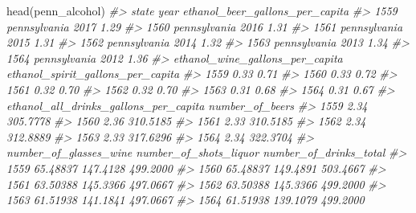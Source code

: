 \documentclass[
  12pt,
]{book}
\newenvironment{Shaded}{\begin{snugshade}}{\end{snugshade}}
\newcommand{\CommentTok}[1]{\textcolor[rgb]{0.37,0.37,0.37}{\textit{#1}}}
\newcommand{\FunctionTok}[1]{\textcolor[rgb]{0,0,0}{#1}}
\newcommand{\NormalTok}[1]{#1}
\begin{document}
\begin{Shaded}
\begin{Highlighting}[]
\FunctionTok{head}\NormalTok{(penn\_alcohol)}
\CommentTok{\#\textgreater{}             state year ethanol\_beer\_gallons\_per\_capita}
\CommentTok{\#\textgreater{} 1559 pennsylvania 2017                            1.29}
\CommentTok{\#\textgreater{} 1560 pennsylvania 2016                            1.31}
\CommentTok{\#\textgreater{} 1561 pennsylvania 2015                            1.31}
\CommentTok{\#\textgreater{} 1562 pennsylvania 2014                            1.32}
\CommentTok{\#\textgreater{} 1563 pennsylvania 2013                            1.34}
\CommentTok{\#\textgreater{} 1564 pennsylvania 2012                            1.36}
\CommentTok{\#\textgreater{}      ethanol\_wine\_gallons\_per\_capita ethanol\_spirit\_gallons\_per\_capita}
\CommentTok{\#\textgreater{} 1559                            0.33                              0.71}
\CommentTok{\#\textgreater{} 1560                            0.33                              0.72}
\CommentTok{\#\textgreater{} 1561                            0.32                              0.70}
\CommentTok{\#\textgreater{} 1562                            0.32                              0.70}
\CommentTok{\#\textgreater{} 1563                            0.31                              0.68}
\CommentTok{\#\textgreater{} 1564                            0.31                              0.67}
\CommentTok{\#\textgreater{}      ethanol\_all\_drinks\_gallons\_per\_capita number\_of\_beers}
\CommentTok{\#\textgreater{} 1559                                  2.34        305.7778}
\CommentTok{\#\textgreater{} 1560                                  2.36        310.5185}
\CommentTok{\#\textgreater{} 1561                                  2.33        310.5185}
\CommentTok{\#\textgreater{} 1562                                  2.34        312.8889}
\CommentTok{\#\textgreater{} 1563                                  2.33        317.6296}
\CommentTok{\#\textgreater{} 1564                                  2.34        322.3704}
\CommentTok{\#\textgreater{}      number\_of\_glasses\_wine number\_of\_shots\_liquor number\_of\_drinks\_total}
\CommentTok{\#\textgreater{} 1559               65.48837               147.4128               499.2000}
\CommentTok{\#\textgreater{} 1560               65.48837               149.4891               503.4667}
\CommentTok{\#\textgreater{} 1561               63.50388               145.3366               497.0667}
\CommentTok{\#\textgreater{} 1562               63.50388               145.3366               499.2000}
\CommentTok{\#\textgreater{} 1563               61.51938               141.1841               497.0667}
\CommentTok{\#\textgreater{} 1564               61.51938               139.1079               499.2000}
\end{Highlighting}
\end{Shaded}
\end{document}
